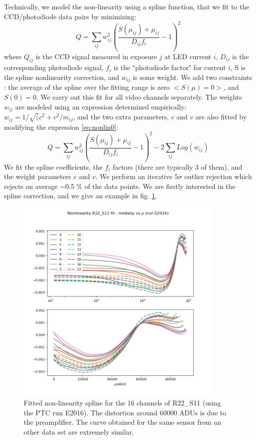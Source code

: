Technically, we model the non-linearity using a spline function, that we fit to the CCD/photodiode data pairs by minimizing:
\begin{equation}
Q = \sum_{ij} w_{ij}^2 \left( \frac{ S(\mu_{ij}) +\mu_{ij}  }{D_{ij} f_i} -1 \right)^2
\label{eq:nonlin0}
\end{equation}
where $Q_{ij}$ is the CCD signal measured in exposure $j$ at LED current $i$,
$D_{ij}$ is the corresponding photodiode signal, $f_i$ is the "photodiode factor" for current $i$, S is the spline nonlinearity correction, and $w_{ij}$ is some weight. We add two constraints : the average of the spline over the fitting range is zero $<S(\mu)=0>$, and $S(0) = 0$. We carry out this fit for all video channels separately. The weights $w_{ij}$ are modeled using an expression determined empirically: $w_{ij} = 1/\sqrt(c^2+v^2/m_{ij}$, and the two extra parameters, $c$ and $v$ are also fitted by modifying the expression \ref{eq:nonlin0}:
\begin{equation}
Q = \sum_{ij} w_{ij}^2 \left( \frac{ S(\mu_{ij}) +\mu_{ij}  }{D_{ij} f_i} -1 \right)^2 - 2 \sum_{ij} Log(w_{ij})
\label{eq:nonlin1}
\end{equation}
We fit the spline coefficients, the $f_i$ factors (there are typically 3 of them), and the weight parameters $c$ and $v$. We perform an iterative 5$\sigma$ outlier rejection which rejects on average $\sim $0.5 \% of the data points.  
We are firstly interested in the spline correction, and we give an example in fig. \ref{fig:nonlin_model}.
\begin{figure}
\begin{centering}
\includegraphics[width=0.9\textwidth]{sections/figures/E2016_nonlin_model.png}
\end{centering}
\caption{Fitted non-linearity spline for the 16 channels of R22_S11 (using the PTC run E2016). The distortion around 60000 ADUs is due to the preamplifier. The curve obtained for the same sensor from an other data set are extremely similar. \label{fig:nonlin_model}}


\end{figure}



